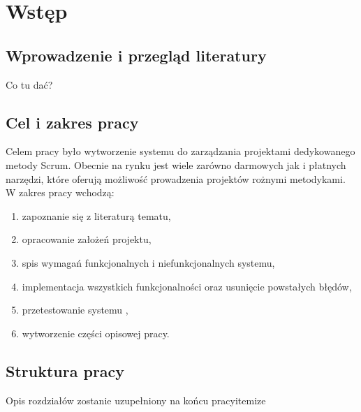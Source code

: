 \chapter{Wstęp}
\section{Wprowadzenie i przegląd literatury}

Co tu dać?

\section{Cel i zakres pracy}
Celem pracy było wytworzenie systemu do zarządzania projektami dedykowanego metody Scrum. Obecnie na rynku jest wiele zarówno darmowych jak i płatnych narzędzi, które oferują możliwość prowadzenia projektów rożnymi metodykami. W zakres pracy wchodzą:
\begin{enumerate}
	\item zapoznanie się z literaturą tematu,
	\item opracowanie założeń projektu,
	\item spis wymagań funkcjonalnych i niefunkcjonalnych systemu,
	\item implementacja wszystkich funkcjonalności oraz usunięcie powstałych błędów,
	\item przetestowanie systemu ,
	\item wytworzenie części opisowej pracy.
	
\end{enumerate}


\section{Struktura pracy}
Opis rozdziałów zostanie uzupełniony na końcu pracyitemize